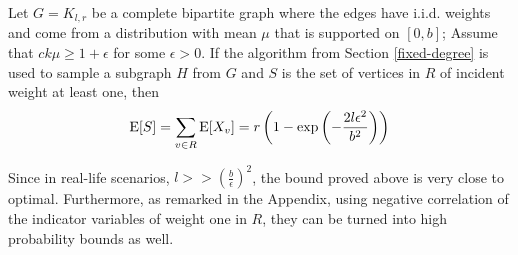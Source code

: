 \begin{thm}
Let $G=K_{l,r}$ be a complete bipartite graph where the edges have i.i.d. weights and come from a distribution with mean $\mu$ that is supported on $[0,b]$; Assume that $ck\mu \geq 1+\epsilon$ for some $\epsilon > 0$. If the algorithm from Section \ref{fixed-degree} is used to sample a subgraph $H$ from $G$ and $S$ is the set of vertices in $R$ of incident weight at least one, then
\[ \text{E}[S] = \sum_{v\in R} \text{E}[X_v] = r\left(1-\exp\left(-\frac{2l\epsilon^2}{b^2}\right)\right) \]
\end{thm}
Since in real-life scenarios, $l >> (\frac{b}{\epsilon})^2$, the bound proved above is very close to optimal. Furthermore, as remarked in the Appendix, using negative correlation of the indicator variables of weight one in $R$, they can be turned into high probability bounds as well.

